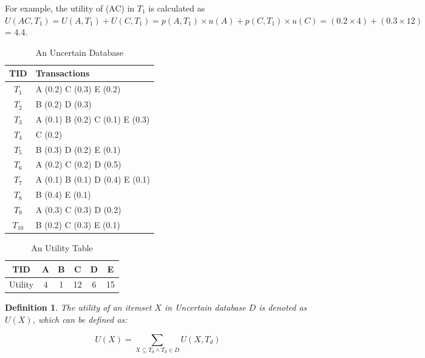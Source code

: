 \documentclass[conference]{IEEEtran}
\newtheorem{IEEEdef}{Definition}
\begin{document}
For example, the utility of (AC) in $T_1$ is calculated as $U(AC, T_1) = U(A, T_1) + U(C, T_1) = p(A, T_1) \times u(A) + p(C, T_1) \times u(C) = (0.2 \times 4) + (0.3 \times 12)$ = 4.4.

\begin{table}
  \centering
  \caption{An Uncertain Database}
  \label{tab:UD}
  \begin{tabular}{|c|l|}\hline
  \bfseries {TID} & \bfseries {Transactions} \\ \hline
  $T_1$ & A (0.2) C (0.3) E (0.2) \\ \hline
  $T_2$ & B (0.2) D (0.3) \\ \hline
  $T_3$ & A (0.1) B (0.2) C (0.1) E (0.3) \\ \hline
  $T_4$ & C (0.2) \\ \hline
  $T_5$ & B (0.3) D (0.2) E (0.1) \\ \hline
  $T_6$ & A (0.2) C (0.2) D (0.5) \\ \hline
  $T_7$ & A (0.1) B (0.1) D (0.4) E (0.1) \\ \hline
  $T_8$ & B (0.4) E (0.1) \\ \hline
  $T_9$ & A (0.3) C (0.3) D (0.2) \\ \hline
  $T_{10}$ & B (0.2) C (0.3) E (0.1) \\ \hline
  \end{tabular}
\end{table}

\begin{table}
  \centering
  \caption{An Utility Table}
  \label{tab:UT}
  \begin{tabular}{|c|c|c|c|c|c|}\hline
  \bfseries {TID} & \bfseries {A} & \bfseries {B} & \bfseries {C} & \bfseries {D} & \bfseries {E} \\ \hline
  Utility & 4 & 1 & 12 & 6 & 15\\ \hline
  \end{tabular}
\end{table}

\begin{IEEEdef}
\label{def:U}
The utility of an itemset $X$ in Uncertain database $D$ is denoted as $U(X)$, which can be defined as:
\end{IEEEdef}

\vspace{-0.4cm}
\begin{equation}
\label{eq:U}
U(X)
= \sum_{X \subseteq T_d \wedge T_d \in D}
U(X,T_d)
\end{equation}
\vspace{-0.4cm}
\end{document}
